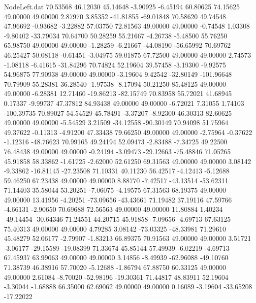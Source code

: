 \begin{filecontents}{NodeLeft.dat}
  70.53568   46.12030   45.14648    -3.90925   -6.45194   60.80625   74.15625   49.00000   49.00000    2.87970    3.85352  -41.81855  -69.01848
  70.58620   49.74548   47.96692    -0.93682   -3.22882   57.03750   72.81563   49.00000   49.00000   -0.74548    1.03308   -9.80402  -33.79034
  70.64700   50.28259   55.21667    -4.26738   -5.48500   55.76250   65.98750   49.00000   49.00000   -1.28259   -6.21667  -44.08190  -56.65992
  70.69762   46.25427   50.08118    -0.61451   -3.04975   59.01875   67.72500   49.00000   49.00000    2.74573   -1.08118   -6.41615  -31.84296
  70.74824   52.19604   39.57458    -3.19300   -9.92575   54.96875   77.90938   49.00000   49.00000   -3.19604    9.42542  -32.80149 -101.96648
  70.79909   55.28381   36.28540    -1.97538   -8.17094   50.21250   85.48125   49.00000   49.00000   -6.28381   12.71460  -19.86213  -82.15749
  70.83958   55.72021   41.68945     0.17337   -9.99737   47.37812   84.93438   49.00000   49.00000   -6.72021    7.31055    1.74103 -100.39735
  70.89027   54.54529   45.78491    -3.37207   -8.92300   46.30313   82.60625   49.00000   49.00000   -5.54529    3.21509  -34.12558  -90.30149
  70.94098   51.75964   49.37622    -0.11313   -4.91200   47.33438   79.66250   49.00000   49.00000   -2.75964   -0.37622   -1.12316  -48.76623
  70.99165   49.24194   52.09473    -2.83488   -7.34725   49.22500   76.48438   49.00000   49.00000   -0.24194   -3.09473  -29.12663  -75.48846
  71.05265   45.91858   58.33862    -1.61725   -2.62000   52.61250   69.31563   49.00000   49.00000    3.08142   -9.33862  -16.81145  -27.23508
  71.10331   40.11230   56.42517    -4.12413   -5.12688   59.46250   67.23438   49.00000   49.00000    8.88770   -7.42517  -43.13514  -53.62311
  71.14403   35.58044   53.20251    -7.06075   -4.19575   67.31563   68.19375   49.00000   49.00000   13.41956   -4.20251  -73.09656  -43.43661
  71.19482   37.19116   47.59766    -4.66131   -2.90650   70.69688   72.56563   49.00000   49.00000   11.80884    1.40234  -49.14454  -30.64346
  71.24551   44.20715   45.91858    -7.09656   -4.69713   67.63125   75.40313   49.00000   49.00000    4.79285    3.08142  -73.03325  -48.33981
  71.29610   45.48279   52.06177    -2.79907   -1.83213   66.89375   70.91563   49.00000   49.00000    3.51721   -3.06177  -29.15589  -19.08399
  71.33674   45.85144   57.49939    -6.02219   -4.69713   67.45937   63.99063   49.00000   49.00000    3.14856   -8.49939  -62.96088  -49.10760
  71.38739   46.38916   57.70020    -5.12688   -1.86794   67.88750   60.33125   49.00000   49.00000    2.61084   -8.70020  -52.98196  -19.30361
  71.44817   48.83911   52.19604    -3.30044   -1.68888   66.35000   62.69062   49.00000   49.00000    0.16089   -3.19604  -33.65208  -17.22022

\end{filecontents}
